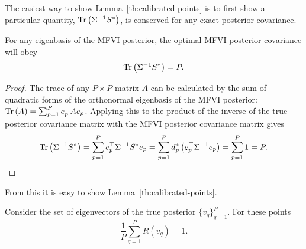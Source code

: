 The easiest way to show Lemma~\ref{th:calibrated-points} is to first show a particular quantity,  $\text{Tr}\left(\Sigma^{-1} S^* \right)$, is conserved for any exact posterior covariance.  
\begin{lemma}
\label{th:conserved-trace}
    For any eigenbasis of the MFVI posterior, the optimal MFVI posterior covariance will obey
    \begin{equation}
        \text{Tr}\left(\Sigma^{-1}S^*\right) = P.
    \end{equation}
\end{lemma}
\begin{proof} 
    The trace of any $P \times P$  matrix $A$ can be calculated by the sum of quadratic forms of the orthonormal eigenbasis of the MFVI posterior: $\text{Tr}\left(A\right) = \sum_{p=1}^P e_p^\top A e_p$. Applying this to the product of the inverse of the true posterior covariance matrix with the MFVI posterior covariance matrix gives
    \begin{equation}
        \text{Tr}\left(\Sigma^{-1}S^*\right) = \sum_{p=1}^P e^\top_p  \Sigma^{-1} S^* e_p = \sum_{p=1}^P d_p^* \left( e^\top_p  \Sigma^{-1} e_p\right) = \sum_{p=1}^P 1 = P. 
    \end{equation}
\end{proof}

From this it is easy to show Lemma~\ref{th:calibrated-points}. 

\begin{lemma*}
    Consider the set of eigenvectors of the true posterior $\{v_q\}_{q=1}^P$. For these points 
    \begin{equation}
     \frac{1}{P}\sum_{q=1}^P R(v_q ) = 1.  
    \end{equation}
\end{lemma*}


